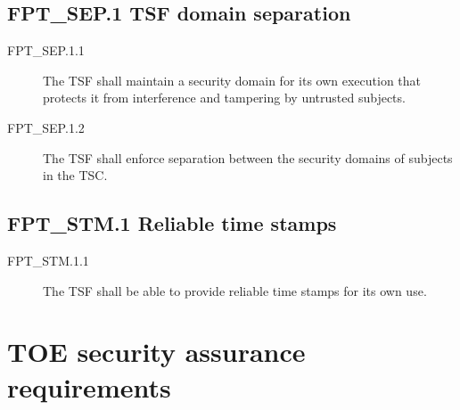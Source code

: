 \documentclass[10pt,a4paper,english]{book}
\begin{document}

\hypertarget{fpt-sep-1-tsf-domain-separation}{}
\subsection{FPT{\_}SEP.1 TSF domain separation}
\begin{description}
\item[FPT{\_}SEP.1.1 ]

The TSF shall maintain a security domain for its own execution that
protects it from interference and tampering by untrusted
subjects.

\item[FPT{\_}SEP.1.2 ]

The TSF shall enforce separation between the
security domains of subjects in the TSC.

\end{description}



\hypertarget{fpt-stm-1-reliable-time-stamps}{}
\subsection{FPT{\_}STM.1 Reliable time stamps}
\begin{description}
\item[FPT{\_}STM.1.1]

The TSF shall be able to provide reliable time stamps for its own use.

\end{description}



\hypertarget{toe-security-assurance-requirements}{}
\section{TOE security assurance requirements}
\end{document}
